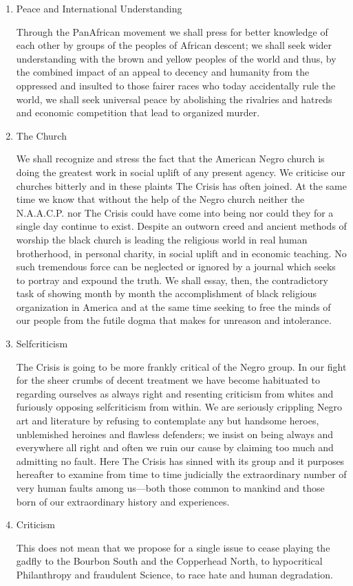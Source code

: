 \documentclass[letterpaper,10pt,english]{jupyterBook}
\begin{document}
\begin{enumerate}
\item {} 
\sphinxAtStartPar
Peace and International Understanding

\sphinxAtStartPar
Through the Pan\sphinxhyphen{}African movement we shall press for better knowledge of each other by groups of the peoples of African descent; we shall seek wider understanding with the brown and yellow peoples of the world and thus, by the combined impact of an appeal to decency and humanity from the oppressed and insulted to those fairer races who today accidentally rule the world, we shall seek universal peace by abolishing the rivalries and hatreds and economic competition that lead to organized murder.

\item {} 
\sphinxAtStartPar
The Church

\sphinxAtStartPar
We shall recognize and stress the fact that the American Negro church is doing the greatest work in social uplift of any present agency. We criticise our churches bitterly and in these plaints The Crisis has often joined. At the same time we know that without the help of the Negro church neither the N.A.A.C.P. nor The Crisis could have come into being nor could they for a single day continue to exist. Despite an outworn creed and ancient methods of worship the black church is leading the religious world in real human brotherhood, in personal charity, in social uplift and in economic teaching. No such tremendous force can be neglected or ignored by a journal which seeks to portray and expound the truth. We shall essay, then, the contradictory task of showing month by month the accomplishment of black religious organization in America and at the same time seeking to free the minds of our people from the futile dogma that makes for unreason and intolerance.

\item {} 
\sphinxAtStartPar
Self\sphinxhyphen{}criticism

\sphinxAtStartPar
The Crisis is going to be more frankly critical of the Negro group. In our fight for the sheer crumbs of decent treatment we have become habituated to regarding ourselves as always right and resenting criticism from whites and furiously opposing self\sphinxhyphen{}criticism from within. We are seriously crippling Negro art and literature by refusing to contemplate any but handsome heroes, unblemished heroines and flawless defenders; we insist on being always and everywhere all right and often we ruin our cause by claiming too much and admitting no fault. Here The Crisis has sinned with its group and it purposes hereafter to examine from time to time judicially the extraordinary number of very human faults among us—both those common to mankind and those born of our extraordinary history and experiences.

\item {} 
\sphinxAtStartPar
Criticism

\sphinxAtStartPar
This does not mean that we propose for a single issue to cease playing the gadfly to the Bourbon South and the Copperhead North, to hypocritical Philanthropy and fraudulent Science, to race hate and human degradation.

\end{enumerate}
\end{document}

